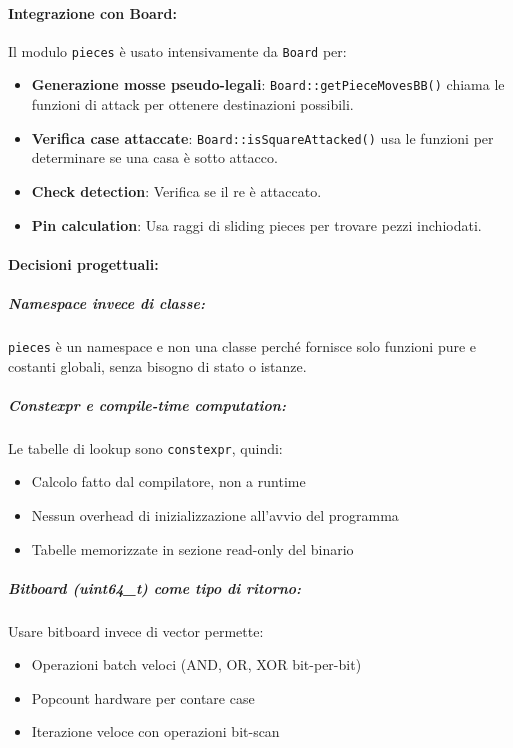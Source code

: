\paragraph{Integrazione con Board:}

Il modulo \texttt{pieces} è usato intensivamente da \texttt{Board} per:
\begin{itemize}
  \item \textbf{Generazione mosse pseudo-legali}: \texttt{Board::getPieceMovesBB()}
        chiama le funzioni di attack per ottenere destinazioni possibili.
  \item \textbf{Verifica case attaccate}: \texttt{Board::isSquareAttacked()} usa
        le funzioni per determinare se una casa è sotto attacco.
  \item \textbf{Check detection}: Verifica se il re è attaccato.
  \item \textbf{Pin calculation}: Usa raggi di sliding pieces per trovare pezzi inchiodati.
\end{itemize}

\paragraph{Decisioni progettuali:}

\subparagraph{Namespace invece di classe:}
\texttt{pieces} è un namespace e non una classe perché fornisce solo funzioni pure
e costanti globali, senza bisogno di stato o istanze.

\subparagraph{Constexpr e compile-time computation:}
Le tabelle di lookup sono \texttt{constexpr}, quindi:
\begin{itemize}
  \item Calcolo fatto dal compilatore, non a runtime
  \item Nessun overhead di inizializzazione all'avvio del programma
  \item Tabelle memorizzate in sezione read-only del binario
\end{itemize}

\subparagraph{Bitboard (uint64\_t) come tipo di ritorno:}
Usare bitboard invece di vector permette:
\begin{itemize}
  \item Operazioni batch veloci (AND, OR, XOR bit-per-bit)
  \item Popcount hardware per contare case
  \item Iterazione veloce con operazioni bit-scan
\end{itemize}

